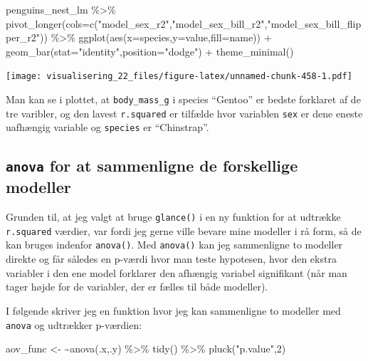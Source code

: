 \documentclass[
]{book}
\newenvironment{Shaded}{\begin{snugshade}}{\end{snugshade}}
\newcommand{\AttributeTok}[1]{\textcolor[rgb]{0.77,0.63,0.00}{#1}}
\newcommand{\DecValTok}[1]{\textcolor[rgb]{0.00,0.00,0.81}{#1}}
\newcommand{\ErrorTok}[1]{\textcolor[rgb]{0.64,0.00,0.00}{\textbf{#1}}}
\newcommand{\FunctionTok}[1]{\textcolor[rgb]{0.00,0.00,0.00}{#1}}
\newcommand{\NormalTok}[1]{#1}
\newcommand{\OtherTok}[1]{\textcolor[rgb]{0.56,0.35,0.01}{#1}}
\newcommand{\SpecialCharTok}[1]{\textcolor[rgb]{0.00,0.00,0.00}{#1}}
\newcommand{\StringTok}[1]{\textcolor[rgb]{0.31,0.60,0.02}{#1}}
\begin{document}
\begin{Shaded}
\begin{Highlighting}[]
\NormalTok{penguins\_nest\_lm }\SpecialCharTok{\%\textgreater{}\%} 
  \FunctionTok{pivot\_longer}\NormalTok{(}\AttributeTok{cols=}\FunctionTok{c}\NormalTok{(}\StringTok{"model\_sex\_r2"}\NormalTok{,}\StringTok{"model\_sex\_bill\_r2"}\NormalTok{,}\StringTok{"model\_sex\_bill\_flipper\_r2"}\NormalTok{)) }\SpecialCharTok{\%\textgreater{}\%}
  \FunctionTok{ggplot}\NormalTok{(}\FunctionTok{aes}\NormalTok{(}\AttributeTok{x=}\NormalTok{species,}\AttributeTok{y=}\NormalTok{value,}\AttributeTok{fill=}\NormalTok{name)) }\SpecialCharTok{+}
  \FunctionTok{geom\_bar}\NormalTok{(}\AttributeTok{stat=}\StringTok{"identity"}\NormalTok{,}\AttributeTok{position=}\StringTok{"dodge"}\NormalTok{) }\SpecialCharTok{+}
  \FunctionTok{theme\_minimal}\NormalTok{()}
\end{Highlighting}
\end{Shaded}

\texttt{[image: visualisering\_22\_files/figure-latex/unnamed-chunk-458-1.pdf]}

Man kan se i plottet, at \texttt{body\_mass\_g} i species ``Gentoo'' er bedste forklaret af de tre varibler, og den lavest \texttt{r.squared} er tilfælde hvor variablen \texttt{sex} er dene eneste uafhængig variable og \texttt{species} er ``Chinstrap''.

\hypertarget{anova-for-at-sammenligne-de-forskellige-modeller}{%
\subsection{\texorpdfstring{\texttt{anova} for at sammenligne de forskellige modeller}{anova for at sammenligne de forskellige modeller}}\label{anova-for-at-sammenligne-de-forskellige-modeller}}

Grunden til, at jeg valgt at bruge \texttt{glance()} i en ny funktion for at udtrække \texttt{r.squared} værdier, var fordi jeg gerne ville bevare mine modeller i rå form, så de kan bruges indenfor \texttt{anova()}. Med \texttt{anova()} kan jeg sammenligne to modeller direkte og får således en p-værdi hvor man teste hypotesen, hvor den ekstra variabler i den ene model forklarer den afhængig variabel signifikant (når man tager højde for de variabler, der er fælles til både modeller).

I følgende skriver jeg en funktion hvor jeg kan sammenligne to modeller med \texttt{anova} og udtrækker p-værdien:

\begin{Shaded}
\begin{Highlighting}[]
\NormalTok{aov\_func }\OtherTok{\textless{}{-}} \ErrorTok{\textasciitilde{}}\FunctionTok{anova}\NormalTok{(.x,.y) }\SpecialCharTok{\%\textgreater{}\%} \FunctionTok{tidy}\NormalTok{() }\SpecialCharTok{\%\textgreater{}\%} \FunctionTok{pluck}\NormalTok{(}\StringTok{"p.value"}\NormalTok{,}\DecValTok{2}\NormalTok{)}
\end{Highlighting}
\end{Shaded}
\end{document}
